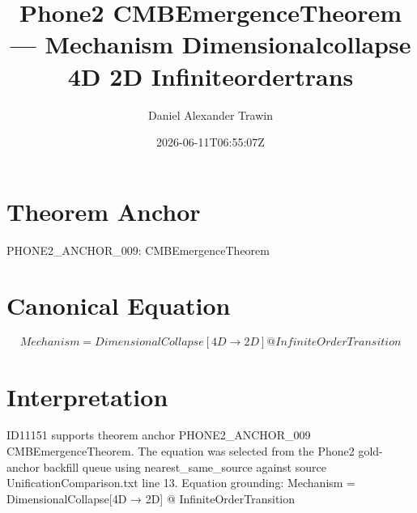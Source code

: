 \documentclass[11pt]{article}
\title{Phone2 CMBEmergenceTheorem — Mechanism Dimensionalcollapse 4D 2D Infiniteordertrans}
\author{Daniel Alexander Trawin}
\date{2026-06-11T06:55:07Z}
\begin{document}
\maketitle
\section*{Theorem Anchor}
PHONE2_ANCHOR_009: CMBEmergenceTheorem
\section*{Canonical Equation}
\[
Mechanism = DimensionalCollapse[4D → 2D] @ InfiniteOrderTransition
\]
\section*{Interpretation}
ID11151 supports theorem anchor PHONE2_ANCHOR_009 CMBEmergenceTheorem. The equation was selected from the Phone2 gold-anchor backfill queue using nearest_same_source against source UnificationComparison.txt line 13. Equation grounding: Mechanism = DimensionalCollapse[4D → 2D] @ InfiniteOrderTransition
\end{document}
